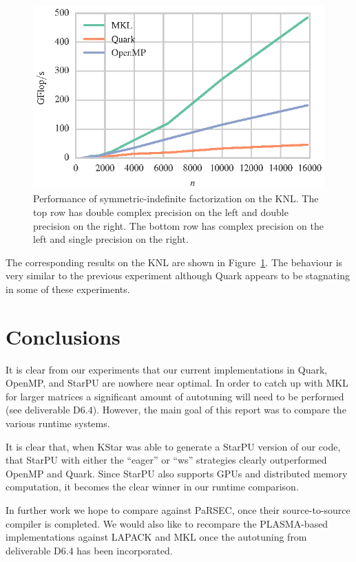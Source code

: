 \documentclass[a4paper,12pt]{article}
\begin{document}
\begin{figure}[t]
  \includegraphics[scale=.85]{fig/knl_ram_ssytrf_weak_scaling.eps}
  \caption{Performance of symmetric-indefinite factorization on the KNL.
    The top row has double complex precision on the left and double
    precision on the right.
    The bottom row has complex precision on the left and single
    precision on the right.}
  \label{fig.ldlt_knl_ram}
\end{figure}

The corresponding results on the KNL are shown in
Figure~\ref{fig.ldlt_knl_ram}.
The behaviour is very similar to the previous experiment
although Quark appears to be stagnating in some of these experiments.

\section{Conclusions}
\label{sec.conclusions}

It is clear from our experiments that our current implementations in
Quark, OpenMP, and StarPU are nowhere near optimal.
In order to catch up with MKL for larger matrices a significant amount
of autotuning will need to be performed (see deliverable D6.4).
However,
the main goal of this report was to compare the various runtime
systems.

It is clear that,
when KStar was able to generate a StarPU version of our code,
that StarPU with either the ``eager'' or ``ws'' strategies
clearly outperformed OpenMP and Quark.
Since StarPU also supports GPUs and distributed memory computation,
it becomes the clear winner in our runtime comparison.

In further work we hope to compare against PaRSEC,
once their source-to-source compiler is completed.
We would also like to recompare the PLASMA-based implementations
against LAPACK and MKL once the autotuning from deliverable D6.4
has been incorporated.




\end{document}
